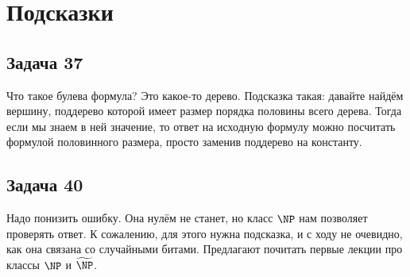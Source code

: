\section{Подсказки}
\subsection{Задача 37}
	Что такое булева формула?
	Это какое-то дерево.
	Подсказка такая: давайте найдём вершину, поддерево которой имеет размер порядка половины всего дерева.
	Тогда если мы знаем в ней значение, то ответ на исходную формулу можно посчитать формулой половинного размера,
	просто заменив поддерево на константу.

\subsection{Задача 40}
	Надо понизить ошибку.
	Она нулём не станет, но класс $\NP$ нам позволяет проверять ответ.
	К сожалению, для этого нужна подсказка, и с ходу не очевидно, как она связана
	со случайными битами.
	Предлагают почитать первые лекции про классы $\NP$ и $\widetilde{\NP}$.
